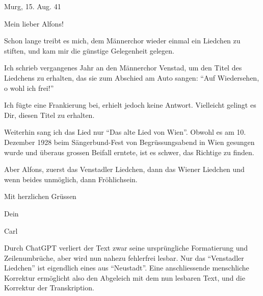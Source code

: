 \documentclass[12pt, a4paper, ngerman, bidi=default]{article}
\begin{document}
\begin{tcolorbox}[colback=oldLetter, colframe=black, sharp corners, width=\textwidth]
Murg, 15. Aug. 41

Mein lieber Alfons!

Schon lange treibt es mich, dem Männerchor wieder einmal ein Liedchen zu stiften, und kam mir die günstige Gelegenheit gelegen.

Ich schrieb vergangenes Jahr an den Männerchor Venstad, um den Titel des Liedchens zu erhalten, das sie zum Abschied am Auto sangen: \enquote{Auf Wiedersehen, o wohl ich frei!}

Ich fügte eine Frankierung bei, erhielt jedoch keine Antwort. Vielleicht gelingt es Dir, diesen Titel zu erhalten.

Weiterhin sang ich das Lied nur \enquote{Das alte Lied von Wien}. Obwohl es am 10. Dezember 1928 beim Sängerbund-Fest von Begrüssungsabend in Wien gesungen wurde und überaus grossen Beifall erntete, ist es schwer, das Richtige zu finden.

Aber Alfons, zuerst das Venstadler Liedchen, dann das Wiener Liedchen und wenn beides unmöglich, dann Fröhlichsein.

Mit herzlichen Grüssen

Dein

Carl
\end{tcolorbox}
\label{fig:Carl-LLM}

Durch ChatGPT verliert der Text zwar seine ursprüngliche Formatierung und Zeilenumbrüche, aber wird nun nahezu fehlerfrei lesbar. Nur das \enquote{Venstadler Liedchen} ist eigendlich eines aus \enquote{Neustadt}. Eine anschliessende menschliche Korrektur ermöglicht also den Abgeleich mit dem nun lesbaren Text, und die Korrektur der Transkription.
\end{document}

